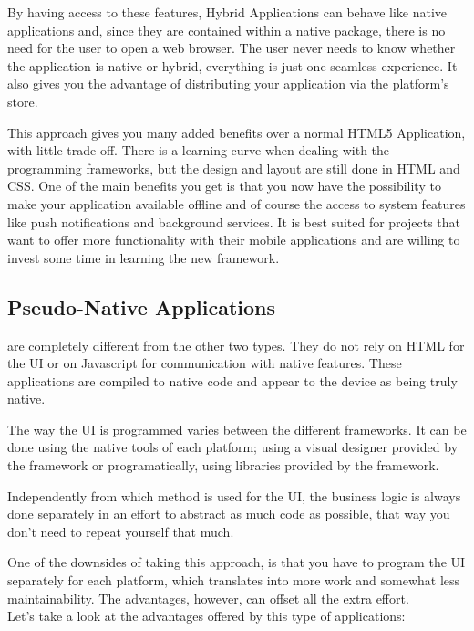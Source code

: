 By having access to these features, Hybrid Applications can behave like native applications and, since they are contained within a native package, there is no need for the user to open a web browser. The user never needs to know whether the application is native or hybrid, everything is just one seamless experience. It also gives you the advantage of distributing your application via the platform's store.


This approach gives you many added benefits over a normal HTML5 Application, with little trade-off. There is a learning curve when dealing with the programming frameworks, but the design and layout are still done in HTML and CSS. One of the main benefits you get is that you now have the possibility to make your application available offline and of course the access to system features like push notifications and background services. It is best suited for projects that want to offer more functionality with their mobile applications and are willing to invest some time in learning the new framework.  

\subsection{Pseudo-Native Applications}\label{sec:pseudo_app}
 are completely different from the other two types. They do not rely on HTML for the UI or on Javascript for communication with native features. These applications are compiled to native code and appear to the device as being truly native.


The way the UI is programmed varies between the different frameworks. It can be done using the native tools of each platform; using a visual designer provided by the framework or programatically, using libraries provided by the framework.


Independently from which method is used for the UI, the business logic is always done separately in an effort to abstract as much code as possible, that way you don't need to repeat yourself that much.


One of the downsides of taking this approach, is that you have to program the UI separately for each platform, which translates into more work and somewhat less maintainability. The advantages, however, can offset all the extra effort.\\


Let's take a look at the advantages offered by this type of applications:

